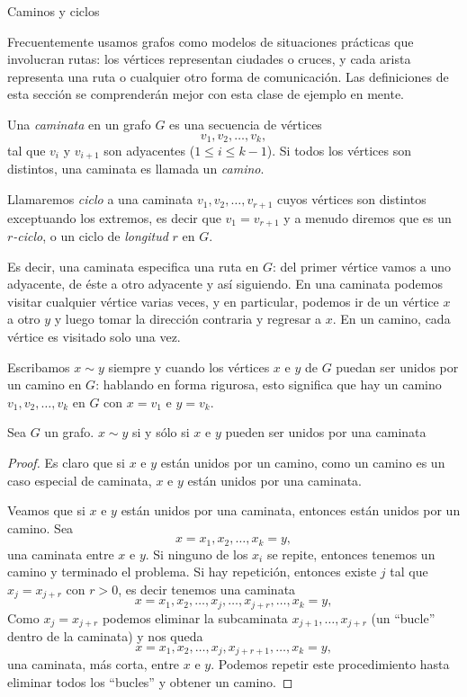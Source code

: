 \begin{section}{Caminos y ciclos}\label{5.4}

Frecuentemente usamos grafos como modelos de situaciones prácticas
que involucran rutas: los vértices representan ciudades o cruces,
y cada arista representa una ruta o cualquier otro forma de
comunicación. Las definiciones de esta sección se comprenderán
mejor con esta clase de ejemplo en mente.

\begin{definicion} \rm Una {\em caminata} en un grafo $G$ es  
una secuencia de vértices
$$
v_1,v_2,\ldots,v_k,
$$
tal que $v_i$ y $v_{i+1}$ son adyacentes ($1 \le i \le k-1$). Si
todos los vértices son distintos, una caminata es llamada un {\em
camino}.  

Llamaremos {\em ciclo} a una caminata  
$v_1,v_2,\ldots,v_{r+1}$ cuyos vértices son distintos exceptuando
los extremos, es decir que $v_1=v_{r+1}$ y  a menudo diremos que es un {\em
$r$-ciclo}, o un ciclo de {\em longitud} $r$ en $G$.
\end{definicion}

Es decir, una caminata especifica una ruta en $G$: del primer
vértice vamos a uno adyacente, de éste a otro adyacente y así
siguiendo. En una caminata podemos visitar cualquier vértice
varias veces, y en particular, podemos ir de un vértice $x$ a otro
$y$ y luego tomar la dirección contraria y regresar a $x$. En un
camino, cada vértice es visitado solo una vez.

Escribamos $x \sim y$ siempre y cuando los vértices $x$ e $y$ de
$G$ puedan ser unidos por un camino en $G$: hablando en forma
rigurosa, esto significa que hay un camino $v_1,v_2,\ldots,v_k$ en
$G$ con $x=v_1$ e $y=v_k$. 

\begin{lema} Sea $G$ un grafo. $x \sim y$ si  y sólo si $x$ e $y$ pueden ser unidos por una caminata 
\end{lema}
\begin{proof}Es claro que si $x$ e $y$ están unidos por un camino, como  un camino es un caso especial de caminata, $x$ e $y$ están unidos por una caminata.

Veamos que si  $x$ e $y$ están unidos por una caminata, entonces están unidos por un camino. Sea 
$$
x=x_1,x_2,\ldots,x_k=y,
$$
una caminata entre  $x$ e $y$. Si ninguno de los $x_i$ se repite, entonces tenemos un camino y terminado el problema. Si hay repetición, entonces existe $j$ tal que $x_j = x_{j+r}$ con $r >0$, es decir tenemos una caminata
$$
x=x_1,x_2,\ldots,x_j,\ldots,x_{j+r},\ldots, x_k=y,
$$
Como $x_j = x_{j+r}$ podemos eliminar la subcaminata $x_{j+1},\ldots,x_{j+r}$ (un ``bucle'' dentro de la caminata) y nos queda 
$$
x=x_1,x_2,\ldots,x_j,x_{j+r+1},\ldots, x_k=y,
$$
una caminata, más corta,  entre $x$ e $y$. Podemos repetir este procedimiento hasta eliminar todos los ``bucles'' y obtener un camino.
\end{proof}


\end{section}
